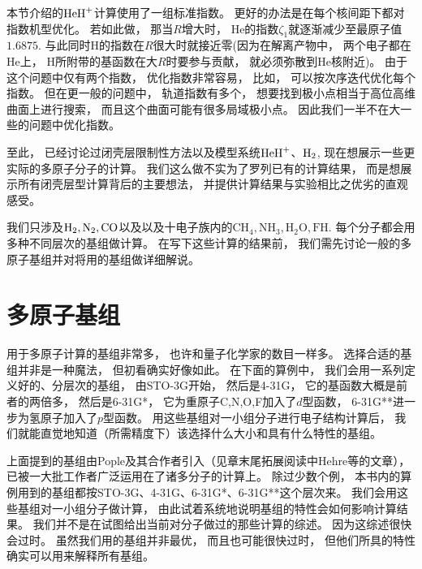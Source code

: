 
本节介绍的$\mathrm{HeH}^+$计算使用了一组标准指数。
更好的办法是在每个核间距下都对指数机型优化。
若如此做，
那当$R$增大时，
$\text{He}$的指数$\zeta_1$就逐渐减少至最原子值$1.6875$. 
与此同时$\text{H}$的指数在$R$很大时就接近零(因为在解离产物中，
两个电子都在$\text{He}$上，
$\text{H}$所附带的基函数在大$R$时要参与贡献，
就必须弥散到$\text{He}$核附近)。
由于这个问题中仅有两个指数，
优化指数非常容易，
比如，
可以按次序迭代优化每个指数。
但在更一般的问题中，
轨道指数有多个，
想要找到极小点相当于高位高维曲面上进行搜索，
而且这个曲面可能有很多局域极小点。
因此我们一半不在大一些的问题中优化指数。


至此，
已经讨论过闭壳层限制性\hft 方法以及模型系统$\mathrm{HeH}^+$、$\mathrm{H}_2$, 
现在想展示一些更实际的多原子分子的计算。
我们这么做不实为了罗列已有的计算结果，
而是想展示所有闭壳层\hft 型计算背后的主要想法，
并提供计算结果与实验相比之优劣的直观感受。


我们只涉及$\mathrm{H}_2, \text{N}_2, \text{CO}$以及以及十电子族内的$\text{CH}_4, \text{NH}_3, \text{H}_2\text{O}, \text{FH}$.
每个分子都会用多种不同层次的基组做计算。
在写下这些计算的结果前，
我们需先讨论一般的多原子基组并对将用的基组做详细解说。


\section{多原子基组}
用于多原子计算的基组非常多，
也许和量子化学家的数目一样多。
选择合适的基组并非是一种魔法，
但初看确实好像如此。
在下面的算例中，
我们会用一系列定义好的、分层次的基组，
由STO-3G开始，
然后是4-31G，
它的基函数大概是前者的两倍多，
然后是6-31G*，
它为重原子C,N,O,F加入了$d$型函数，
6-31G**进一步为氢原子加入了$p$型函数。
用这些基组对一小组分子进行电子结构计算后，
我们就能直觉地知道（所需精度下）该选择什么大小和具有什么特性的基组。


上面提到的基组由Pople及其合作者引入（见章末尾拓展阅读中Hehre等的文章），
已被一大批工作者广泛运用在了诸多分子的计算上。
除过少数个例，
本书内的算例用到的基组都按STO-3G、4-31G、6-31G*、6-31G**这个层次来。
我们会用这些基组对一小组分子做计算，
由此试着系统地说明基组的特性会如何影响计算结果。
我们并不是在试图给出当前对分子做过的那些计算的综述。
因为这综述很快会过时。
虽然我们用的基组并非最优，
而且也可能很快过时，
但他们所具的特性确实可以用来解释所有基组。


